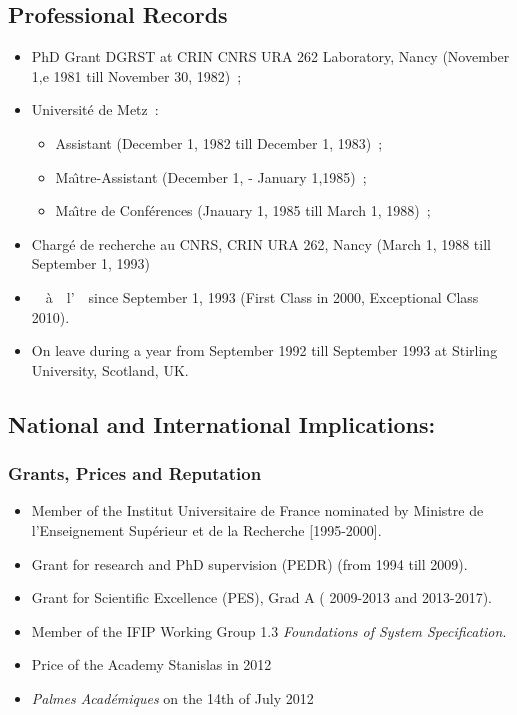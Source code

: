 \documentclass[ 12pt]{article}
\begin{document}
\subsection{Professional Records}


\begin{itemize}
\item PhD Grant  DGRST  at  CRIN CNRS URA 262 Laboratory,   Nancy  (November 1,e 1981 till November 30, 1982)~;
\item Universit\'e de Metz~:
  \begin{itemize}
  \item Assistant  (December 1,  1982 till December 1,  1983)~;
  \item Ma\^{\i}tre-Assistant (December 1, - January 1,1985)~;
  \item Ma\^{\i}tre de Conf\'erences (Jnauary 1, 1985 till March 1, 1988)~;
  \end{itemize}
\item Charg\'e de recherche au CNRS, CRIN URA 262, Nancy (March 1, 1988 till  September 1, 1993)
\item \pr~~\`a~~l'~\inancyIesial\ since September 1, 1993 (First Class in 2000, Exceptional Class 2010).


\item On leave  during a year  from September 1992 till September 1993 at Stirling University, Scotland, UK.


\end{itemize}


\subsection{National and International Implications:}


\subsubsection{Grants, Prices and Reputation}

\begin{itemize}
\item Member of the Institut Universitaire
de France nominated by   Ministre de l'Enseignement Sup\'erieur et de la Recherche [1995-2000].
\item  Grant for research and PhD supervision (PEDR) (from 1994  till  2009).
\item  Grant for Scientific Excellence (PES), Grad A  ( 2009-2013  and  2013-2017).
\item Member of the IFIP Working Group  1.3  \textit{Foundations of System Specification}.
\item Price of the Academy Stanislas in 2012

\item \textit{Palmes Acad\'emiques} on the  14th of  July  2012

\end{itemize}
\end{document}
